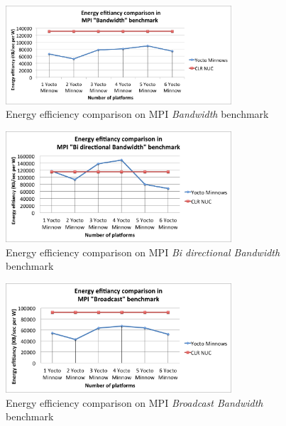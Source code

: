 \begin{figure}[H]
\centering
\includegraphics[width=0.75\textwidth]{images/energy_results/bandwidth.png}
\caption{Energy efficiency comparison on MPI \textit{Bandwidth} benchmark}
\label{bandwidth_energy}
\end{figure}

\begin{figure}[H]
\centering
\includegraphics[width=0.75\textwidth]{images/energy_results/bibw.png}
\caption{Energy efficiency comparison on MPI \textit{Bi directional Bandwidth} benchmark}
\label{bibw_energy}
\end{figure}


\begin{figure}[H]
\centering
\includegraphics[width=0.75\textwidth]{images/energy_results/broadcast.png}
\caption{Energy efficiency comparison on MPI \textit{Broadcast Bandwidth} benchmark}
\label{broadcast_energy}
\end{figure}


\clearpage
